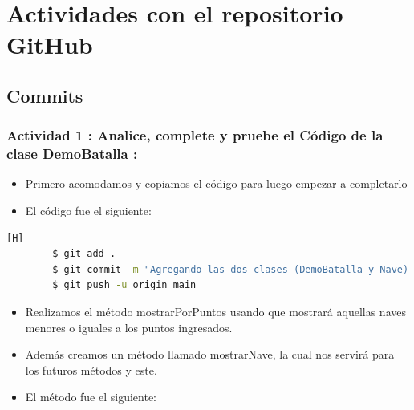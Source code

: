 \documentclass{article}
\begin{document}
	\section{Actividades con el repositorio GitHub}
        
        

    \subsection{Commits}
    \subsubsection{Actividad 1 : Analice, complete y pruebe el Código de la clase DemoBatalla :}
    \begin{itemize}	
        \item Primero acomodamos y copiamos el código para luego empezar a completarlo
	\item El código fue el siguiente:
    \end{itemize}
    
    
    
    \begin{lstlisting}[language=bash,caption={Commit: Agregando las dos clases (DemoBatalla y Nave) para completar los métodos}][H]
		$ git add .
		$ git commit -m "Agregando las dos clases (DemoBatalla y Nave) para completar los métodos"			
		$ git push -u origin main
	\end{lstlisting}

    \begin{itemize}	
        \item Realizamos el método mostrarPorPuntos usando que mostrará aquellas naves menores o iguales a los puntos ingresados.
        \item Además creamos un método llamado mostrarNave, la cual nos servirá para los futuros métodos y este.
	\item El método fue el siguiente:
    \end{itemize}
    
\end{document}
